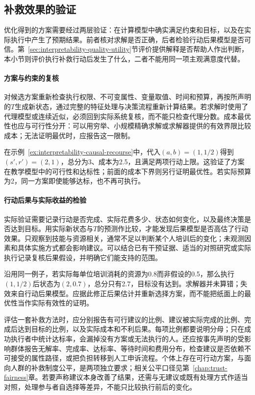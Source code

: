 \subsection{补救效果的验证}
\label{sec:interpretability-recourse-validation}

优化得到的方案需要经过两层验证：在计算模型中确实满足约束和目标，以及在实际执行中产生了预期结果。前者核对求解是否正确，后者检验行动后果模型是否可信。第~\ref{sec:interpretability-quality-utility}节评价提供解释是否帮助人作出判断，本小节则评价执行补救行动后发生了什么，二者不能用同一项主观满意度代替。

\paragraph{方案与约束的复核}

对候选方案重新检查执行权限、不可变属性、变量取值、时间和预算，再按所声明的$T$生成新状态，通过完整的特征处理与决策流程重新计算结果。若求解时使用了代理模型或连续近似，必须回到实际系统复核，而不能只检查代理分数。成本最优性也应与可行性分开：可以用穷举、小规模精确求解或求解器提供的有效界限比较成本；无法证明最优时，应报告这一限制。

在示例~\ref{ex:interpretability-causal-recourse}中，代入$(a,b)=(1,1/2)$得到$(s',r')=(2,1)$，总分为3、成本为2.5，且满足两项行动上限。这验证了方案在教学模型中的可行性和达标性；前面的成本下界则另行证明最优性。若实际预算为2，同一方案即使能够达标，也不再可执行。

\paragraph{行动后果与实际收益的检验}

实际验证需要记录行动是否完成、实际花费多少、状态如何变化，以及最终决策是否达到目标。用实际新状态与$T$的预测作比较，才能发现后果模型是否高估了行动效果。只观察到技能与资源相关，通常不足以判断某个人培训后的变化；未观测因素和具体实施方式都会影响建议。可以结合已有干预证据、适当的对照研究或实际执行记录复核后果假设，并明确它们能支持的范围。

沿用同一例子，若实际每单位培训消耗的资源为0.8而非假设的0.5，那么执行$(1,1/2)$后状态为$(2,0.7)$，总分只有2.7，目标没有达到。求解器并未算错；失效来自行动后果模型。应据此修正后果估计并重新选择方案，而不能把纸面上的最优性当作实际有效性的证明。

评估一套补救方法时，应分别报告有可行建议的比例、建议被实际完成的比例、完成后达到目标的比例，以及实际成本和不利后果。每项比例都要说明分母；只在成功执行者中统计达标率，会漏掉没有方案或无法执行的人。还应按事先声明的受影响群体报告无解率、完成率、达标率、等待时间和费用分布，检查建议是否依赖不可接受的属性路径，或把负担转移到人工申诉流程。个体上存在可行动方案，与面向人群的补救制度公平，是两项独立要求；相关公平口径见第~\ref{chap:trust-fairness}章。若要声称建议本身改善了结果，还需与无建议或既有处理方式作适当对照，处理参与者自选择等差异，不能只比较执行前后的变化。

